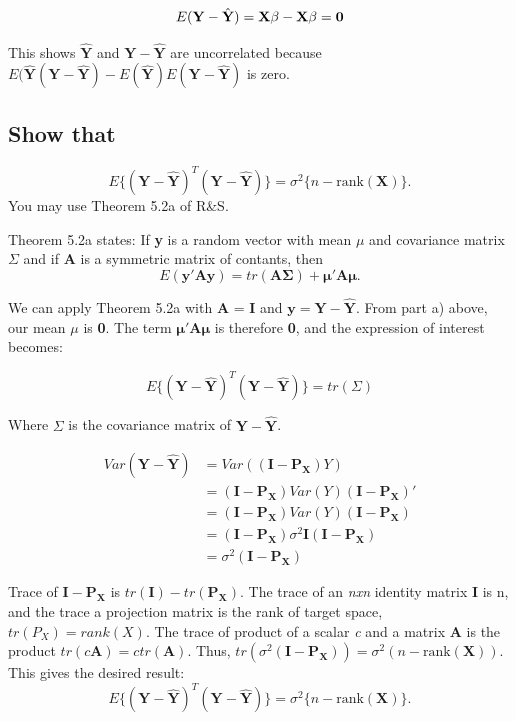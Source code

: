 \documentclass[11pt]{article}
\begin{document}
\[
E(\mathbf{Y} - \hat{\mathbf{Y}})= \mathbf{X\beta} - \mathbf{X\beta} \\
                                = \mathbf{0}
\]

This shows $\hat{\mathbf{Y}}$ and $\mathbf{Y} - \hat{\mathbf{Y}}$ are
uncorrelated because $E(\hat{\mathbf{Y}}(\mathbf{Y} -
\hat{\mathbf{Y}}) - E(\hat{\mathbf{Y}})E(\mathbf{Y} -
\hat{\mathbf{Y}})$ is zero.
\subsection{Show that}
\label{sec-1-2}

$$ E\{(\mathbf{Y} - \hat{\mathbf{Y}})^T(\mathbf{Y} -
\hat{\mathbf{Y}})\} = \sigma^2\{n-\mathrm{rank}(\mathbf{X})\}.$$
You may use Theorem 5.2a of R\&S.


Theorem 5.2a states:
If \textbf{y} is a random vector with mean \textbf{$\mu$} and covariance
matrix \textbf{$\Sigma$} and if \textbf{A} is a symmetric matrix of contants, then 
\[
E(\mathbf{y'Ay}) = tr(\mathbf{A\Sigma}) +\mathbf{\mu' A \mu}.
\]


We can apply Theorem 5.2a with \textbf{A} = \textbf{I} and $\mathbf{y} =
\mathbf{Y} - \hat{\mathbf{Y}}$. From part a) above, our mean \textbf{$\mu$}
is \textbf{0}. The term $\mathbf{\mu' A \mu}$ is therefore \textbf{0}, and the
expression of interest becomes:

$$E\{(\mathbf{Y} - \hat{\mathbf{Y}})^T(\mathbf{Y}
-\hat{\mathbf{Y}})\}   = tr(\Sigma)$$

Where $\Sigma$ is the covariance matrix of $\mathbf{Y} - \hat{\mathbf{Y}}$.

\begin{align*}
Var(\mathbf{Y} - \hat{\mathbf{Y}}) &= Var ((\mathbf{I} - \mathbf{P_X})Y) \\
&= (\mathbf{I} - \mathbf{P_X}) Var(Y) (\mathbf{I} - \mathbf{P_X})' \\
&= (\mathbf{I} - \mathbf{P_X}) Var(Y) (\mathbf{I} - \mathbf{P_X}) \\
&= (\mathbf{I} - \mathbf{P_X}) \sigma^2 \mathbf{I} (\mathbf{I} - \mathbf{P_X}) \\
&= \sigma^2(\mathbf{I} - \mathbf{P_X})
\end{align*}

Trace of $\mathbf{I} - \mathbf{P_X}$ is
$tr(\mathbf{I})-tr(\mathbf{P_X})$. 
The trace of an \emph{nxn} identity matrix \textbf{I} is n, and the trace a
projection matrix is the rank of target space, $tr(P_X) = rank(X)$.
The trace of product of a scalar \emph{c} and a matrix \textbf{A} is the product
$tr(c\mathbf{A}) = c tr(\mathbf{A})$. Thus, $tr(\sigma^2(\mathbf{I} -
\mathbf{P_X})) = \sigma^2 (n - \mathrm{rank}(\mathbf{X}))$.
This gives the desired result: 
$$ E\{(\mathbf{Y} - \hat{\mathbf{Y}})^T(\mathbf{Y} -\hat{\mathbf{Y}})\} 
= \sigma^2\{n-\mathrm{rank}(\mathbf{X})\}.$$
\end{document}
